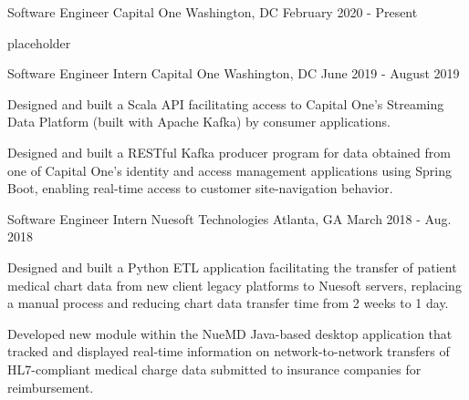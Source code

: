 
\begin{cventries}
  \cventry
    {Software Engineer} %
    {Capital One} %
    {Washington, DC} %
    {February 2020 - Present} %
    {
      \begin{cvitems} %
        \item {placeholder}
      \end{cvitems}
    }

  \cventry
    {Software Engineer Intern} %
    {Capital One} %
    {Washington, DC} %
    {June 2019 - August 2019} %
    {
      \begin{cvitems} %
        \item {Designed and built a Scala API facilitating access to Capital One’s Streaming Data Platform
        (built with Apache Kafka) by consumer applications.}
        \item {Designed and built a RESTful Kafka producer program for data obtained from one of Capital
        One’s identity and access management applications using Spring Boot, enabling real-time access
        to customer site-navigation behavior.}
      \end{cvitems}
    }

  \cventry
    {Software Engineer Intern} %
    {Nuesoft Technologies} %
    {Atlanta, GA} %
    {March 2018 - Aug. 2018} %
    {
      \begin{cvitems} %
        \item {Designed and built a Python ETL application facilitating the
        transfer of patient medical chart data from new client legacy platforms to Nuesoft servers, replacing a manual process and reducing chart data transfer time from 2 weeks to 1 day.}
        \item {Developed new module within the NueMD Java-based desktop application that tracked and displayed real-time information on network-to-network transfers of HL7-compliant medical charge data submitted to insurance companies for reimbursement.}
      \end{cvitems}
    }

\end{cventries}
